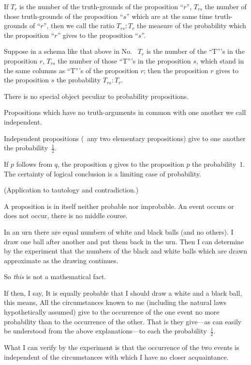 {If $T_{r}$ is the number of the truth-grounds of the
proposition ``$r$'', $T_{rs}$ the number of those truth-grounds
of the proposition ``$s$'' which are at the
same time truth-grounds of ``$r$'', then we call the
ratio $T_{rs} : T_{r}$ the measure of the probability which
the proposition ``$r$'' gives to the proposition ``$s$''.}


{Suppose in a schema like that above in No.~
$T_{r}$ is the number of the ``T'''s in the proposition
$r$, $T_{rs}$ the number of those ``T'''s in
the proposition $s$, which stand in the same columns
as ``T'''s of the proposition $r$; then the proposition
$r$ gives to the proposition $s$ the probability
$T_{rs} : T_{r}$.}


{There is no special object peculiar to probability
propositions.}


{Propositions which have no truth-arguments
in common with one another we call independent.
\enlargethispage{-3pt} %

Independent propositions (\exempliGratia\ any two elementary
propositions) give to one another the probability~$\frac{1}{2}$.

If $p$ follows from $q$, the proposition $q$ gives
to the proposition $p$ the probability~1. The
certainty of logical conclusion is a limiting case
of probability.

(Application to tautology and contradiction.)}


{A proposition is in itself neither probable nor
improbable. An event occurs or does not occur,
there is no middle course.}


{In an urn there are equal numbers of white
and black balls (and no others). I draw one
ball after another and put them back in the
urn. Then I can determine by the experiment
that the numbers of the black and white balls
which are drawn approximate as the drawing
continues.

So \emph{this} is not a mathematical fact.

If then, I say, It is equally probable that
I should draw a white and a black ball, this
means, All the circumstances known to me (including
the natural laws hypothetically assumed)
give to the occurrence of the one event no more
probability than to the occurrence of the other.
That is they give---as can easily be understood
from the above explanations---to each the
probability~$\frac{1}{2}$.

What I can verify by the experiment is that
the occurrence of the two events is independent
of the circumstances with which I have no closer
acquaintance.}


